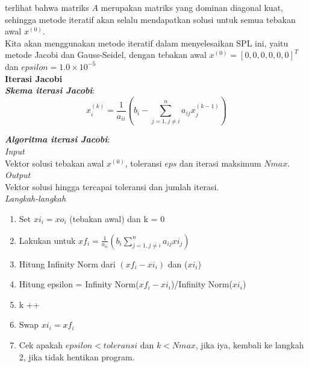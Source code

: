 \documentclass[paper=a4, fontsize=11pt]{scrartcl}
\numberwithin{equation}{section} %
\numberwithin{figure}{section} %
\numberwithin{table}{section} %
\begin{document}
terlihat bahwa matriks $A$ merupakan matriks yang dominan diagonal kuat, sehingga metode iteratif akan selalu mendapatkan solusi untuk semua tebakan awal $x^{(0)}$.\\
Kita akan menggunakan metode iteratif dalam menyelesaikan SPL ini, yaitu metode Jacobi dan Gauss-Seidel, dengan tebakan awal $x^{(0)} = [0, 0, 0, 0, 0, 0]^{T}$ dan $epsilon = 1.0\times 10^{-5}$\\

\newpage
\textbf{\large Iterasi Jacobi}\\
\textit{\textbf{Skema iterasi Jacobi}}:\\
\begin{equation}
x_{i}^{(k)} = \frac{1}{a_{ii}}\left(b_{i} -\sum_{{j=1}, {j\neq i}}^{n}a_{ij}x_{j}^{(k-1)} \right)
\end{equation}

\textit{\textbf{Algoritma iterasi Jacobi}}:\\
\textit{Input}\\
Vektor solusi tebakan awal $x^{(0)}$, toleransi $eps$ dan iterasi maksimum $Nmax$.\\

\textit{Output}\\
Vektor solusi hingga tercapai toleransi dan jumlah iterasi.\\

\textit{Langkah-langkah}
\begin{enumerate}
\item Set $xi_{i} = xo_{i}$ (tebakan awal) dan k = 0
\item Lakukan untuk $xf_{i} = \frac{1}{a_{ii}}\left(b_{i} \sum_{{j=1}, {j\neq i}}^{n}a_{ij}xi_{j} \right)$
\item Hitung Infinity Norm dari $(xf_{i} - xi_{i})$ dan ($xi_{i}$)
\item Hitung epsilon = Infinity Norm($xf_{i} - xi_{i}$)/Infinity Norm($xi_{i}$)
\item k ++
\item Swap $xi_{i} = xf_{i}$
\item Cek apakah $epsilon < toleransi$ dan $k < Nmax$, jika iya, kembali ke langkah 2, jika tidak hentikan program.
\end{enumerate}
\end{document}
